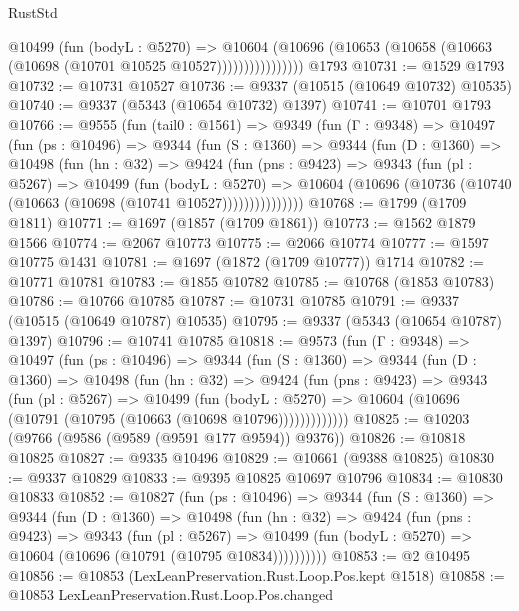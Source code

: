 \begin{lexlean}{RustStd}
\begin{coremodule}
                    @10499
                      (fun (bodyL : @5270) =>
                      @10604
                        (@10696
                          (@10653 (@10658 (@10663 (@10698 (@10701 @10525 @10527))))))))))))))))
    @1793
@10731 := @1529 @1793
@10732 := @10731 @10527
@10736 := @9337 (@10515 (@10649 @10732) @10535)
@10740 := @9337 (@5343 (@10654 @10732) @1397)
@10741 := @10701 @1793
@10766 := @9555
    (fun (tail0 : @1561) =>
    @9349
      (fun (Γ : @9348) =>
      @10497
        (fun (ps : @10496) =>
        @9344
          (fun (S : @1360) =>
          @9344
            (fun (D : @1360) =>
            @10498
              (fun (hn : @32) =>
              @9424
                (fun (pns : @9423) =>
                @9343
                  (fun (pl : @5267) =>
                  @10499
                    (fun (bodyL : @5270) =>
                    @10604 (@10696 (@10736 (@10740 (@10663 (@10698 (@10741 @10527)))))))))))))))
@10768 := @1799 (@1709 @1811)
@10771 := @1697 (@1857 (@1709 @1861))
@10773 := @1562 @1879 @1566
@10774 := @2067 @10773
@10775 := @2066 @10774
@10777 := @1597 @10775 @1431
@10781 := @1697 (@1872 (@1709 @10777)) @1714
@10782 := @10771 @10781
@10783 := @1855 @10782
@10785 := @10768 (@1853 @10783)
@10786 := @10766 @10785
@10787 := @10731 @10785
@10791 := @9337 (@10515 (@10649 @10787) @10535)
@10795 := @9337 (@5343 (@10654 @10787) @1397)
@10796 := @10741 @10785
@10818 := @9573
    (fun (Γ : @9348) =>
    @10497
      (fun (ps : @10496) =>
      @9344
        (fun (S : @1360) =>
        @9344
          (fun (D : @1360) =>
          @10498
            (fun (hn : @32) =>
            @9424
              (fun (pns : @9423) =>
              @9343
                (fun (pl : @5267) =>
                @10499
                  (fun (bodyL : @5270) =>
                  @10604 (@10696 (@10791 (@10795 (@10663 (@10698 @10796)))))))))))))
@10825 := @10203 (@9766 (@9586 (@9589 (@9591 @177 @9594)) @9376))
@10826 := @10818 @10825
@10827 := @9335 @10496
@10829 := @10661 (@9388 @10825)
@10830 := @9337 @10829
@10833 := @9395 @10825 @10697 @10796
@10834 := @10830 @10833
@10852 := @10827
    (fun (ps : @10496) =>
    @9344
      (fun (S : @1360) =>
      @9344
        (fun (D : @1360) =>
        @10498
          (fun (hn : @32) =>
          @9424
            (fun (pns : @9423) =>
            @9343
              (fun (pl : @5267) =>
              @10499 (fun (bodyL : @5270) => @10604 (@10696 (@10791 (@10795 @10834))))))))))
@10853 := @2 @10495
@10856 := @10853 (LexLeanPreservation.Rust.Loop.Pos.kept @1518)
@10858 := @10853 LexLeanPreservation.Rust.Loop.Pos.changed

\end{coremodule}
\end{lexlean}
